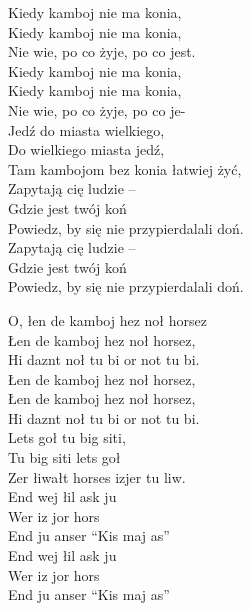 \begin{text}
    \hfill\break
    Kiedy kamboj nie ma konia, \\
    Kiedy kamboj nie ma konia, \\
    Nie wie, po co żyje, po co jest.\\
    Kiedy kamboj nie ma konia,\\
    Kiedy kamboj nie ma konia,\\
    Nie wie, po co żyje, po co je-\\
    Jedź do miasta wielkiego, \\
    Do wielkiego miasta jedź, \\
    Tam kambojom bez konia łatwiej żyć,\\
    Zapytają cię ludzie – \\
    Gdzie jest twój koń\\
    Powiedz, by się nie przypierdalali doń. \\	
    Zapytają cię ludzie – 	\\
    Gdzie jest twój koń \\
    Powiedz, by się nie przypierdalali doń. 

    O, łen de kamboj hez noł horsez\\
    Łen de kamboj hez noł horsez,\\
    Hi daznt noł tu bi or not tu bi. \\
    Łen de kamboj hez noł horsez,\\
    Łen de kamboj hez noł horsez, \\
    Hi daznt noł tu bi or not tu bi. \\
    Lets goł tu big siti, 	\\
    Tu big siti lets goł \\
    Zer łiwałt horses izjer tu liw. \\	
    End wej łil ask ju 	\\
    Wer iz jor hors\\
    End ju anser “Kis maj as” \\
    End wej łil ask ju \\
    Wer iz jor hors\\
    End ju anser “Kis maj as” 	


\end{text}
